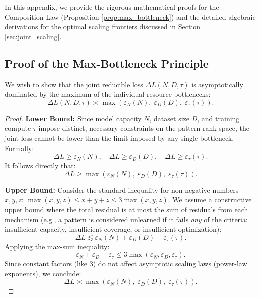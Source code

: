 \documentclass{article}
\theoremstyle{plain}
\theoremstyle{definition}
\theoremstyle{remark}
\begin{document}
In this appendix, we provide the rigorous mathematical proofs for the Composition Law (Proposition \ref{prop:max_bottleneck}) and the detailed algebraic derivations for the optimal scaling frontiers discussed in Section \ref{sec:joint_scaling}.

\subsection{Proof of the Max-Bottleneck Principle}

We wish to show that the joint reducible loss $\Delta L(N,D,\tau)$ is asymptotically dominated by the maximum of the individual resource bottlenecks:
\begin{equation*}
    \Delta L(N,D,\tau) \asymp \max\left( \varepsilon_N(N), \; \varepsilon_D(D), \; \varepsilon_\tau(\tau) \right).
\end{equation*}

\begin{proof}
\textbf{Lower Bound:}
Since model capacity $N$, dataset size $D$, and training compute $\tau$ impose distinct, necessary constraints on the pattern rank space, the joint loss cannot be lower than the limit imposed by any single bottleneck. Formally:
\begin{equation*}
    \Delta L \ge \varepsilon_N(N), \quad \Delta L \ge \varepsilon_D(D), \quad \Delta L \ge \varepsilon_\tau(\tau).
\end{equation*}
It follows directly that:
\begin{equation*}
    \Delta L \ge \max\left( \varepsilon_N(N), \; \varepsilon_D(D), \; \varepsilon_\tau(\tau) \right).
\end{equation*}

\textbf{Upper Bound:}
Consider the standard inequality for non-negative numbers $x,y,z$: $\max(x,y,z) \le x+y+z \le 3\max(x,y,z)$.
We assume a constructive upper bound where the total residual is at most the sum of residuals from each mechanism (e.g., a pattern is considered unlearned if it fails \textit{any} of the criteria: insufficient capacity, insufficient coverage, or insufficient optimization):
\begin{equation*}
    \Delta L \lesssim \varepsilon_N(N) + \varepsilon_D(D) + \varepsilon_\tau(\tau).
\end{equation*}
Applying the max-sum inequality:
\begin{equation*}
    \varepsilon_N + \varepsilon_D + \varepsilon_\tau \le 3 \max\left( \varepsilon_N, \varepsilon_D, \varepsilon_\tau \right).
\end{equation*}
Since constant factors (like 3) do not affect asymptotic scaling laws (power-law exponents), we conclude:
\begin{equation*}
    \Delta L \asymp \max\left( \varepsilon_N(N), \; \varepsilon_D(D), \; \varepsilon_\tau(\tau) \right).
\end{equation*}
\end{proof}
\end{document}
